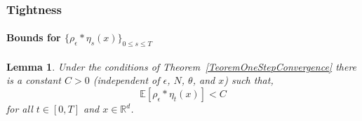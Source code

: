 \documentclass[12pt]{article}
\newtheorem{lemma}[theorem]{Lemma}
\newcommand{\IE}{\mathbb E}
\newcommand{\IR}{\mathbb R}
\begin{document}
\subsubsection{Tightness}

\paragraph{Bounds for $\{ \rho_\epsilon * \eta_s (x)\}_{0 \leq s \leq T}$}

\begin{lemma}
        \label{FirstBoundLocalDensity}
    Under the conditions of Theorem~\ref{TeoremOneStepConvergence}
    there is a constant $C>0$ (independent of $\epsilon$, $N$, $\theta$, and $x$) such that,
    \[ \IE[ \rho_\epsilon*\eta_t(x) ] < C \]
    for all $t \in [0,T]$ and $x \in \IR^d$.
\end{lemma}
\end{document}

